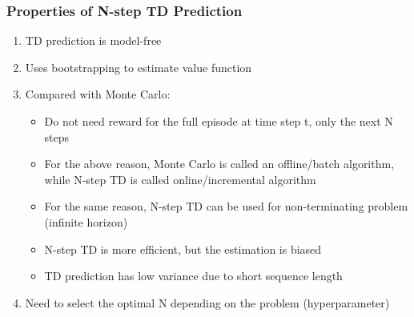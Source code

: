 \documentclass[11pt]{article}
\begin{document}
\subsubsection{Properties of N-step TD Prediction}
\begin{enumerate}
    \item TD prediction is model-free
    \item Uses bootstrapping to estimate value function
    \item Compared with Monte Carlo:
    \begin{itemize}
        \item Do not need reward for the full episode at time step t, only the next N steps
        \item For the above reason, Monte Carlo is called an offline/batch algorithm, while N-step TD is called online/incremental algorithm
        \item For the same reason, N-step TD can be used for non-terminating problem (infinite horizon)
        \item N-step TD is more efficient, but the estimation is biased
        \item TD prediction has low variance due to short sequence length
    \end{itemize}
    \item Need to select the optimal N depending on the problem (hyperparameter)
\end{enumerate}

{


}
\end{document}
